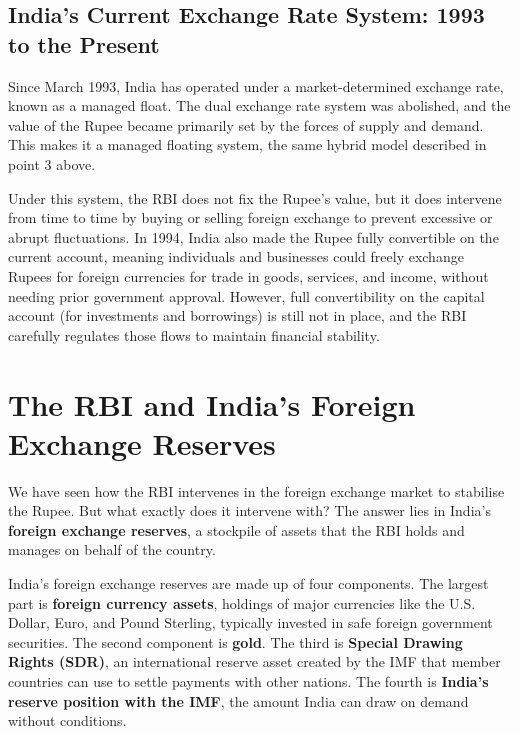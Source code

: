 \documentclass[12pt,a4paper]{article}
\begin{document}
\subsection*{India's Current Exchange Rate System: 1993 to the Present}

Since March 1993, India has operated under a market-determined exchange rate, known as a managed float. The dual exchange rate system was abolished, and the value of the Rupee became primarily set by the forces of supply and demand. This makes it a managed floating system, the same hybrid model described in point 3 above.

Under this system, the RBI does not fix the Rupee's value, but it does intervene from time to time by buying or selling foreign exchange to prevent excessive or abrupt fluctuations. In 1994, India also made the Rupee fully convertible on the current account, meaning individuals and businesses could freely exchange Rupees for foreign currencies for trade in goods, services, and income, without needing prior government approval. However, full convertibility on the capital account (for investments and borrowings) is still not in place, and the RBI carefully regulates those flows to maintain financial stability.

\section*{The RBI and India's Foreign Exchange Reserves}

We have seen how the RBI intervenes in the foreign exchange market to stabilise the Rupee. But what exactly does it intervene with? The answer lies in India's \textbf{foreign exchange reserves}, a stockpile of assets that the RBI holds and manages on behalf of the country.

India's foreign exchange reserves are made up of four components. The largest part is \textbf{foreign currency assets}, holdings of major currencies like the U.S. Dollar, Euro, and Pound Sterling, typically invested in safe foreign government securities. The second component is \textbf{gold}. The third is \textbf{Special Drawing Rights (SDR)}, an international reserve asset created by the IMF that member countries can use to settle payments with other nations. The fourth is \textbf{India's reserve position with the IMF}, the amount India can draw on demand without conditions.
\end{document}
